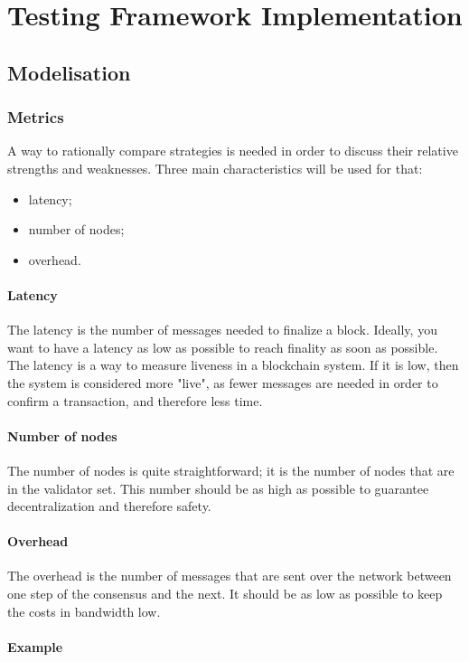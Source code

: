 \chapter{Testing Framework Implementation}
\label{chap:implementation}
\section{Modelisation}
\subsection{Metrics}
\FloatBarrier
A way to rationally compare strategies is needed in order to discuss their
relative strengths and weaknesses. Three main characteristics will be used for
that:
\begin{itemize}
        \item latency;
        \item number of nodes;
        \item overhead.
\end{itemize}

\subsubsection{Latency}
The latency is the number of messages needed to finalize a block. Ideally, you
want to have a latency as low as possible to reach finality as soon as possible.
The latency is a way to measure liveness in a blockchain system. If it is low,
then the system is considered more "live", as fewer messages are needed in order
to confirm a transaction, and therefore less time.

\subsubsection{Number of nodes}
The number of nodes is quite straightforward; it is the number of nodes that are
in the validator set. This number should be as high as possible to guarantee
decentralization and therefore safety.

\subsubsection{Overhead}
The overhead is the number of messages that are sent over the network between
one step of the consensus and the next. It should be as low as possible to keep
the costs in bandwidth low.

\subsubsection{Example}

